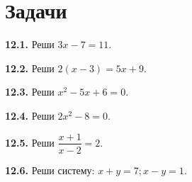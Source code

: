 \section*{Задачи}
\begingroup\setlength{\parskip}{2pt}
\noindent\begin{minipage}[t]{\linewidth}\textbf{12.1.} Реши \(3 x - 7 = 11\).\par\end{minipage}\par
\noindent\begin{minipage}[t]{\linewidth}\textbf{12.2.} Реши \(2 (x - 3) = 5 x + 9\).\par\end{minipage}\par
\noindent\begin{minipage}[t]{\linewidth}\textbf{12.3.} Реши \(x^{2} - 5 x + 6 = 0\).\par\end{minipage}\par
\noindent\begin{minipage}[t]{\linewidth}\textbf{12.4.} Реши \(2 x^{2} - 8 = 0\).\par\end{minipage}\par
\noindent\begin{minipage}[t]{\linewidth}\textbf{12.5.} Реши \(\dfrac{x + 1}{x - 2} = 2\).\par\end{minipage}\par
\noindent\begin{minipage}[t]{\linewidth}\textbf{12.6.} Реши систему: \(x + y = 7;\allowbreak x - y = 1\).\par\end{minipage}\par
